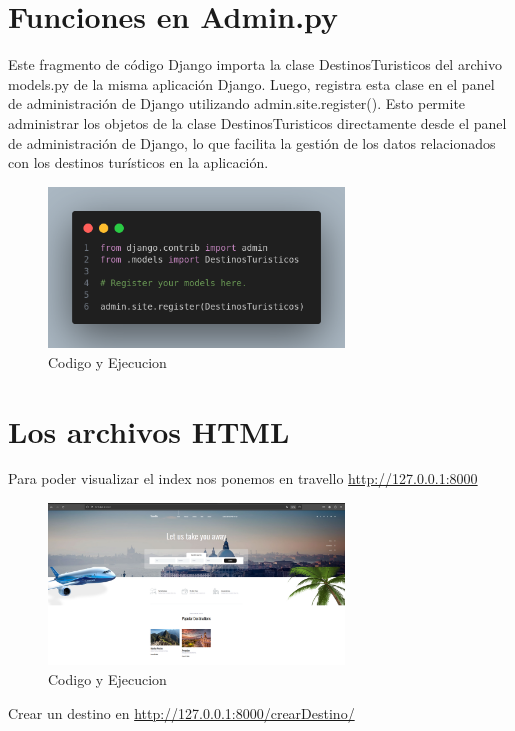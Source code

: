 \documentclass[10pt, a4paper]{article}
\begin{document}
\section{Funciones en Admin.py}
Este fragmento de código Django importa la clase DestinosTuristicos del archivo models.py de la misma aplicación Django. Luego, registra esta clase en el panel de administración de Django utilizando admin.site.register(). Esto permite administrar los objetos de la clase DestinosTuristicos directamente desde el panel de administración de Django, lo que facilita la gestión de los datos relacionados con los destinos turísticos en la aplicación.

\begin{figure}[H]
  \centering
  \includegraphics[width=0.7\textwidth]{img/admin-DestinosTuristicos.png}
  \caption{Codigo y Ejecucion}
\end{figure}

\section{Los archivos HTML}
Para poder visualizar el index nos ponemos en
travello \href{http://127.0.0.1:8000}{http://127.0.0.1:8000}

\begin{figure}[H]
  \centering
  \includegraphics[width=0.7\textwidth]{img/index.png}
  \caption{Codigo y Ejecucion}
\end{figure}

Crear un destino en \href{http://127.0.0.1:8000/crearDestino/}{http://127.0.0.1:8000/crearDestino/}
\end{document}
